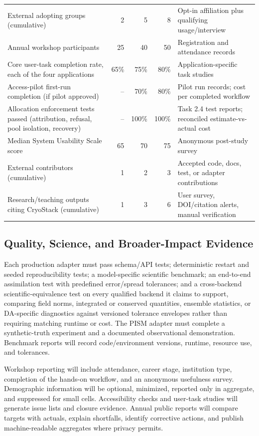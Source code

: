 \begin{table}[ht]
\begin{tabular}{@{}p{}rrrp{}@{}}
External adopting groups (cumulative) & 2 & 5 & 8 & Opt-in affiliation plus qualifying usage/interview \\
Annual workshop participants & 25 & 40 & 50 & Registration and attendance records \\
Core user-task completion rate, each of the four applications & 65\% & 75\% & 80\% & Application-specific task studies \\
Access-pilot first-run completion (if pilot approved) & -- & 70\% & 80\% & Pilot run records; cost per completed workflow \\
Allocation enforcement tests passed (attribution, refusal, pool isolation, recovery) & -- & 100\% & 100\% & Task 2.4 test reports; reconciled estimate-vs-actual cost \\
Median System Usability Scale score & 65 & 70 & 75 & Anonymous post-study survey \\
External contributors (cumulative) & 1 & 2 & 3 & Accepted code, docs, test, or adapter contributions \\
Research/teaching outputs citing CryoStack (cumulative) & 1 & 3 & 6 & User survey, DOI/citation alerts, manual verification \\
\bottomrule
\end{tabular}
\end{table}

\subsection*{Quality, Science, and Broader-Impact Evidence}

Each production adapter must pass schema/API tests; deterministic restart and
seeded reproducibility tests; a model-specific scientific benchmark; an
end-to-end assimilation test with predefined error/spread tolerances; and a
cross-backend scientific-equivalence test on every qualified backend it
claims to support, comparing field norms, integrated or conserved
quantities, ensemble statistics, or DA-specific diagnostics against
versioned tolerance envelopes rather than requiring matching runtime or cost.
The PISM adapter must complete a synthetic-truth experiment and a documented
observational demonstration. Benchmark reports will record code/environment
versions, runtime, resource use, and tolerances.

Workshop reporting will include attendance, career stage, institution type,
completion of the hands-on workflow, and an anonymous usefulness survey.
Demographic information will be optional, minimized, reported only in
aggregate, and suppressed for small cells. Accessibility checks and user-task
studies will generate issue lists and closure evidence. Annual public reports
will compare targets with actuals, explain shortfalls, identify corrective
actions, and publish machine-readable aggregates where privacy permits.

